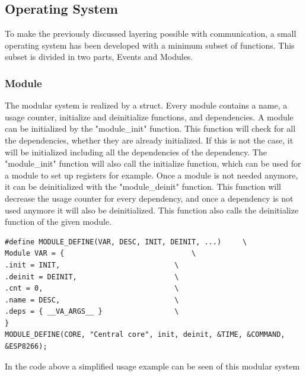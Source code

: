 \subsection{Operating System}
To make the previously discussed layering possible with communication, a small operating system has been developed with a minimum subset of functions. This subset is divided in two parts, Events and Modules.
\subsubsection{Module}
The modular system is realized by a struct. Every module contains a name, a usage counter, initialize and deinitialize functions, and dependencies. A module can be initialized by the "module\_init" function. This function will check for all the dependencies, whether they are already initialized. If this is not the case, it will be initialized including all the dependencies of the dependency. The "module\_init" function will also call the initialize function, which can be used for a module to set up registers for example. Once a module is not needed anymore, it can be deinitialized with the "module\_deinit" function. This function will decrease the usage counter for every dependency, and once a dependency is not used anymore it will also be deinitialized. This function also calls the deinitialize function of the given module.

\begin{verbatim}
#define MODULE_DEFINE(VAR, DESC, INIT, DEINIT, ...)     \
Module VAR = {                          	\
.init = INIT,                           \
.deinit = DEINIT,                       \
.cnt = 0,                               \
.name = DESC,                           \
.deps = { __VA_ARGS__ }                 \
} 
MODULE_DEFINE(CORE, "Central core", init, deinit, &TIME, &COMMAND, &ESP8266);
\end{verbatim}
In the code above a simplified usage example can be seen of this modular system

